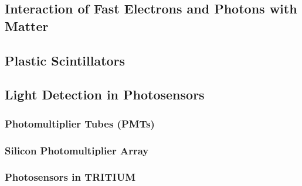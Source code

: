 \documentclass[12pt,a4paper]{book}
\begin{document}
		\subsection[Interaction of Particles with Matter]{Interaction of Fast Electrons and Photons with Matter}\label{subsec:Interaction}
		 
					
		\subsection{Plastic Scintillators} \label{subsec:PlasticScintillators}
		
		
			
		\subsection{Light Detection in Photosensors}\label{subsec:Photosensors}
		
	
			\subsubsection{Photomultiplier Tubes (PMTs)}\label{subsubsec:PMTs}
			
		
			\subsubsection{Silicon Photomultiplier Array}\label{subsubsec:SiPM}
			
			
			\subsubsection{Photosensors in TRITIUM}\label{subsubsec:ComparisonPhotosensors}
			
					
\end{document}
